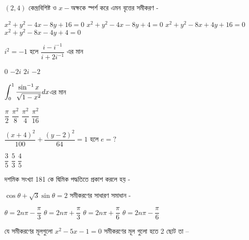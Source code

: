 \documentclass[addpoints]{exam}
\begin{document}
\begin{questions}
\begin{oneparchoices}
\end{oneparchoices}

\question  $ (2,4) $ কেন্দ্রবিশিষ্ট ও $ x- $অক্ষকে স্পর্শ করে এমন বৃত্তের সমীকরণ -

\begin{oneparchoices}
\choice  $ x^{2}+y^{2}-4x-8y+16=0 $
\choice  $ x^{2}+y^{2}-4x-8y+4=0 $
\choice  $ x^{2}+y^{2}-8x+4y+16=0 $
\choice  $ x^{2}+y^{2}-8x-4y+4=0 $
\end{oneparchoices}

\question $ i^{2}=-1 $ হলে $ \dfrac{i-i^{-1}}{i+2i^{-1}} $ এর মান

\begin{oneparchoices}
\choice $ 0 $
\choice $ -2i $
\choice $ 2i $
\choice  $ -2 $

\end{oneparchoices}

\question  $ \mathlarger{\int_{0}^{1}\dfrac{\sin^{-1}x}{\sqrt{1-x^{2}}}dx} $এর মান

\begin{oneparchoices}
\choice $ \dfrac{\pi}{2} $
\choice $ \dfrac{\pi^{2}}{8} $
\choice $ \dfrac{\pi^{2}}{4} $
\choice $ \dfrac{\pi^{2}}{16} $

\end{oneparchoices}

\question  $ \dfrac{(x+4)^{2}}{100} +\dfrac{(y-2)^{2}}{64} =1 $ হলে $ e=? $

\begin{oneparchoices}
\choice $ \dfrac{3}{5} $
\choice $ \dfrac{5}{3} $
\choice $ \dfrac{4}{5} $

\end{oneparchoices}

\question দশমিক সংখ্যা 181 কে দ্বিমিক পদ্ধতিতে প্রকাশ করলে হয় - 

\begin{oneparchoices}
\end{oneparchoices}

\question $ \cos\theta +\sqrt{3}\sin\theta =2 $ সমীকরণের সাধারণ সমাধান -

\begin{oneparchoices}
\choice $ \theta = 2n\pi -\dfrac{\pi}{3} $
\choice $ \theta = 2n\pi +\dfrac{\pi}{3} $
\choice $ \theta = 2n\pi +\dfrac{\pi}{6} $
\choice $ \theta = 2n\pi -\dfrac{\pi}{6} $
\end{oneparchoices}

\question যে সমীকরণের মূলগুলো $ x^{2}-5x-1=0 $ সমীকরণের মূল গুলো হতে 2 ছোট তা – 


\end{questions}
\end{document}
